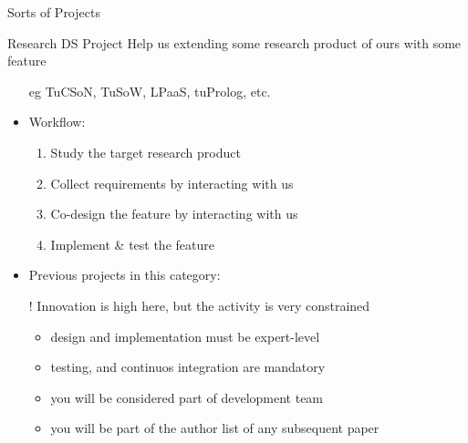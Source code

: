 \documentclass[presentation]{beamer}\mode<presentation>{\usetheme{AMSBolognaFC}}
\begin{document}
\begin{frame}[c, allowframebreaks]{Sorts of Projects}
    \begin{block}{Research DS Project}
        Help us extending some research product of ours with some feature
        \begin{itemize}
            \item[eg] TuCSoN, TuSoW, LPaaS, tuProlog, etc.
            \item Workflow:
            \begin{enumerate}
                \item Study the target research product
                \item Collect requirements by interacting with us
                \item Co-design the feature by interacting with us
                \item Implement \& test the feature
            \end{enumerate}
            \item Previous projects in this category: \cite{Sd2021ProjectTusowCSharpInterface}
            \item[!] Innovation is high here, but the activity is very constrained
            \begin{itemize}
                \item design and implementation must be expert-level
                \item testing, and continuos integration are mandatory
                \item you will be considered part of development team
                \item you will be part of the author list of any subsequent paper
            \end{itemize}
        \end{itemize}
    \end{block}


\end{frame}
\end{document}
